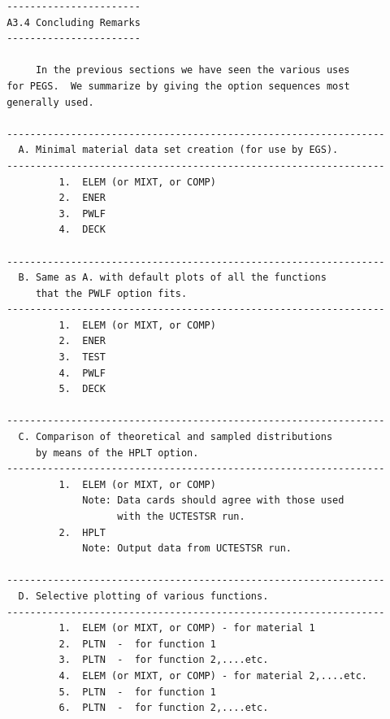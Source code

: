 \newpage \begin{verbatim}
 -----------------------
 A3.4 Concluding Remarks
 -----------------------
 
      In the previous sections we have seen the various uses
 for PEGS.  We summarize by giving the option sequences most
 generally used.
 
 -----------------------------------------------------------------
   A. Minimal material data set creation (for use by EGS).
 -----------------------------------------------------------------
          1.  ELEM (or MIXT, or COMP)
          2.  ENER
          3.  PWLF
          4.  DECK
 
 -----------------------------------------------------------------
   B. Same as A. with default plots of all the functions
      that the PWLF option fits.
 -----------------------------------------------------------------
          1.  ELEM (or MIXT, or COMP)
          2.  ENER
          3.  TEST
          4.  PWLF
          5.  DECK
 
 -----------------------------------------------------------------
   C. Comparison of theoretical and sampled distributions
      by means of the HPLT option.
 -----------------------------------------------------------------
          1.  ELEM (or MIXT, or COMP)
              Note: Data cards should agree with those used
                    with the UCTESTSR run.
          2.  HPLT
              Note: Output data from UCTESTSR run.
 
 -----------------------------------------------------------------
   D. Selective plotting of various functions.
 -----------------------------------------------------------------
          1.  ELEM (or MIXT, or COMP) - for material 1
          2.  PLTN  -  for function 1
          3.  PLTN  -  for function 2,....etc.
          4.  ELEM (or MIXT, or COMP) - for material 2,....etc.
          5.  PLTN  -  for function 1
          6.  PLTN  -  for function 2,....etc.
\end{verbatim}

